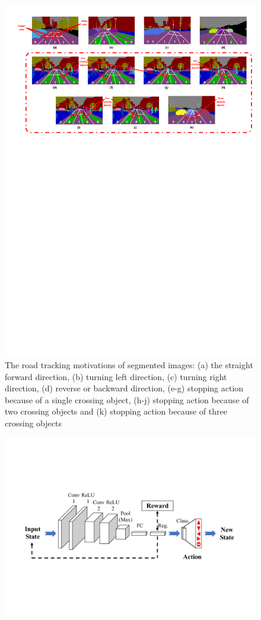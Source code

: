 \begin{intro}
\begin{figure}[!t]
	\includegraphics[scale=.4,trim=2cm 35cm 0cm 2cm,clip]{segmentation3.pdf}
	\caption{The road tracking motivations of segmented images: (a) the straight forward direction, (b) turning left direction, (c) turning right direction, (d) reverse or backward direction, (e-g) stopping action because of a single crossing object, (h-j) stopping action because of two crossing objects and (k) stopping action because of three crossing objects}
	\label{Fig:segmentation}
\end{figure}
\begin{figure}[!h]
	\centering
	\includegraphics[scale=.65,trim=2cm 5.5cm 2cm 5.5cm,clip]{Deep_Reinf_Net1.pdf}

\end{figure}
\end{intro}
